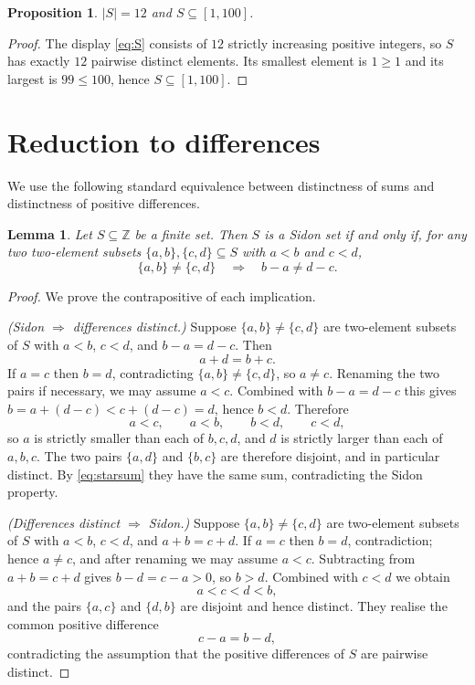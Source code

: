\documentclass[a4paper,11pt]{amsart}
\theoremstyle{plain}
\newtheorem{lemma}[theorem]{Lemma}
\newtheorem{proposition}[theorem]{Proposition}
\theoremstyle{definition}
\begin{document}
\begin{proposition}\label{prop:size}
$|S|=12$ and $S\subseteq[1,100]$.
\end{proposition}

\begin{proof}
The display \eqref{eq:S} consists of $12$ strictly increasing positive
integers, so $S$ has exactly $12$ pairwise distinct elements. Its
smallest element is $1\geq 1$ and its largest is $99\leq 100$, hence
$S\subseteq[1,100]$.
\end{proof}

\section{Reduction to differences}

We use the following standard equivalence between distinctness of sums
and distinctness of positive differences.

\begin{lemma}\label{lem:diff}
Let $S\subseteq\mathbb{Z}$ be a finite set. Then $S$ is a Sidon set if
and only if, for any two two\nobreakdash-element subsets
$\{a,b\},\{c,d\}\subseteq S$ with $a<b$ and $c<d$,
\[
\{a,b\}\neq\{c,d\}\quad\Longrightarrow\quad b-a\neq d-c.
\]
\end{lemma}

\begin{proof}
We prove the contrapositive of each implication.

\smallskip
\noindent\emph{(Sidon $\Rightarrow$ differences distinct.)}
Suppose $\{a,b\}\neq\{c,d\}$ are two\nobreakdash-element subsets of $S$
with $a<b$, $c<d$, and $b-a=d-c$. Then
\begin{equation}\label{eq:starsum}
a+d=b+c.
\end{equation}
If $a=c$ then $b=d$, contradicting $\{a,b\}\neq\{c,d\}$, so $a\neq c$.
Renaming the two pairs if necessary, we may assume $a<c$. Combined
with $b-a=d-c$ this gives $b=a+(d-c)<c+(d-c)=d$, hence $b<d$.
Therefore
\[
a<c,\qquad a<b,\qquad b<d,\qquad c<d,
\]
so $a$ is strictly smaller than each of $b,c,d$, and $d$ is strictly
larger than each of $a,b,c$. The two pairs $\{a,d\}$ and $\{b,c\}$
are therefore disjoint, and in particular distinct. By
\eqref{eq:starsum} they have the same sum, contradicting the Sidon
property.

\smallskip
\noindent\emph{(Differences distinct $\Rightarrow$ Sidon.)}
Suppose $\{a,b\}\neq\{c,d\}$ are two\nobreakdash-element subsets of $S$
with $a<b$, $c<d$, and $a+b=c+d$. If $a=c$ then $b=d$, contradiction;
hence $a\neq c$, and after renaming we may assume $a<c$. Subtracting
from $a+b=c+d$ gives $b-d=c-a>0$, so $b>d$. Combined with $c<d$ we
obtain
\[
a<c<d<b,
\]
and the pairs $\{a,c\}$ and $\{d,b\}$ are disjoint and hence distinct.
They realise the common positive difference
\[
c-a=b-d,
\]
contradicting the assumption that the positive differences of $S$ are
pairwise distinct.
\end{proof}
\end{document}
